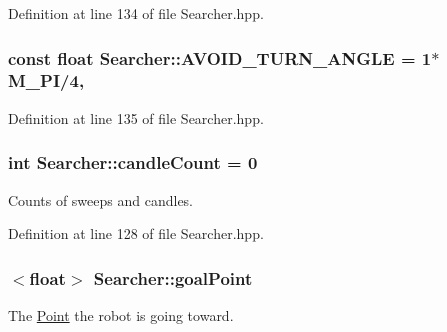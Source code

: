 Definition at line 134 of file Searcher.\-hpp.

\hypertarget{classSearcher_afbe5b3bf208f18f77a3dcdb0aa86a96c}{
\subsubsection[{A\-V\-O\-I\-D\-\_\-\-T\-U\-R\-N\-\_\-\-A\-N\-G\-L\-E}]{\setlength{\rightskip}{0pt plus 5cm}const float Searcher\-::\-A\-V\-O\-I\-D\-\_\-\-T\-U\-R\-N\-\_\-\-A\-N\-G\-L\-E = 1$\ast$M\-\_\-\-P\-I/4\hspace{0.3cm}{\ttfamily [static]}, {\ttfamily [private]}}}\label{classSearcher_afbe5b3bf208f18f77a3dcdb0aa86a96c}


Definition at line 135 of file Searcher.\-hpp.

\hypertarget{classSearcher_acd63673f1b401dffee29f88eceaa1ada}{
\subsubsection[{candle\-Count}]{\setlength{\rightskip}{0pt plus 5cm}int Searcher\-::candle\-Count = 0\hspace{0.3cm}{\ttfamily [private]}}}\label{classSearcher_acd63673f1b401dffee29f88eceaa1ada}


Counts of sweeps and candles. 



Definition at line 128 of file Searcher.\-hpp.

\hypertarget{classSearcher_ae2eb4f5be779517a4e3264b0223459e2}{
\subsubsection[{goal\-Point}]{$<$float$>$ Searcher\-::goal\-Point\hspace{0.3cm}{\ttfamily [private]}}}\label{classSearcher_ae2eb4f5be779517a4e3264b0223459e2}


The \hyperlink{classPoint}{Point} the robot is going toward. 



